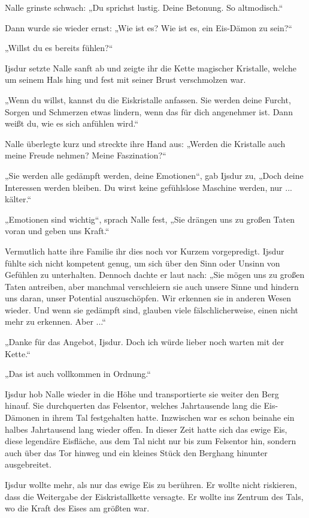Nalle grinste schwach: „Du sprichst lustig. Deine Betonung. So altmodisch.“

Dann wurde sie wieder ernst: „Wie ist es? Wie ist es, ein Eis-Dämon zu sein?“

„Willst du es bereits fühlen?“

Ijsdur setzte Nalle sanft ab und zeigte ihr die Kette magischer Kristalle, welche um seinem Hals hing und fest mit seiner Brust verschmolzen war.

„Wenn du willst, kannst du die Eiskristalle anfassen. Sie werden deine Furcht, Sorgen und Schmerzen etwas lindern, wenn das für dich angenehmer ist. Dann weißt du, wie es sich anfühlen wird.“

Nalle überlegte kurz und streckte ihre Hand aus: „Werden die Kristalle auch meine Freude nehmen? Meine Faszination?“

„Sie werden alle gedämpft werden, deine Emotionen“, gab Ijsdur zu, „Doch deine Interessen werden bleiben. Du wirst keine gefühlslose Maschine werden, nur ... kälter.“

„Emotionen sind wichtig“, sprach Nalle fest, „Sie drängen uns zu großen Taten voran und geben uns Kraft.“

Vermutlich hatte ihre Familie ihr dies noch vor Kurzem vorgepredigt. Ijsdur fühlte sich nicht kompetent genug, um sich über den Sinn oder Unsinn von Gefühlen zu unterhalten. Dennoch dachte er laut nach: „Sie mögen uns zu großen Taten antreiben, aber manchmal verschleiern sie auch unsere Sinne und hindern uns daran, unser Potential auszuschöpfen. Wir erkennen sie in anderen Wesen wieder. Und wenn sie gedämpft sind, glauben viele fälschlicherweise, einen nicht mehr zu erkennen. Aber ...“

„Danke für das Angebot, Ijsdur. Doch ich würde lieber noch warten mit der Kette.“

„Das ist auch vollkommen in Ordnung.“

Ijsdur hob Nalle wieder in die Höhe und transportierte sie weiter den Berg hinauf. Sie durchquerten das Felsentor, welches Jahrtausende lang die Eis-Dämonen in ihrem Tal festgehalten hatte. Inzwischen war es schon beinahe ein halbes Jahrtausend lang wieder offen. In dieser Zeit hatte sich das ewige Eis, diese legendäre Eisfläche, aus dem Tal nicht nur bis zum Felsentor hin, sondern auch über das Tor hinweg und ein kleines Stück den Berghang hinunter ausgebreitet.

Ijsdur wollte mehr, als nur das ewige Eis zu berühren. Er wollte nicht riskieren, dass die Weitergabe der Eiskristallkette versagte. Er wollte ins Zentrum des Tals, wo die Kraft des Eises am größten war.

